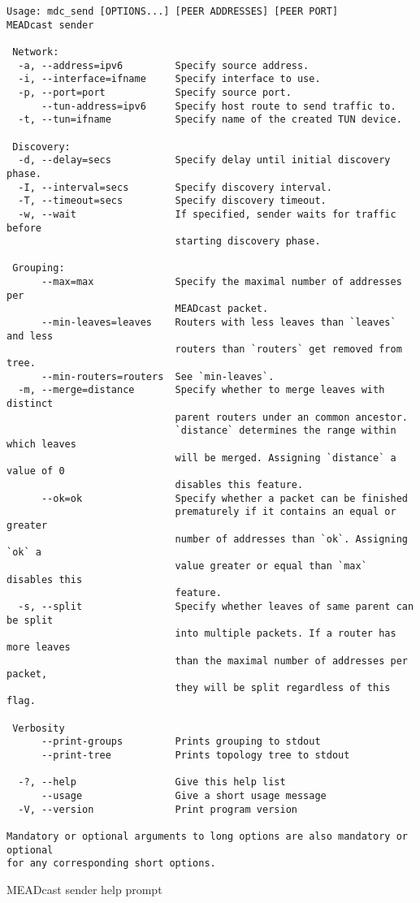 \begin{listing}[h]
\begin{verbatim}
Usage: mdc_send [OPTIONS...] [PEER ADDRESSES] [PEER PORT]
MEADcast sender

 Network:
  -a, --address=ipv6         Specify source address.
  -i, --interface=ifname     Specify interface to use.
  -p, --port=port            Specify source port.
      --tun-address=ipv6     Specify host route to send traffic to.
  -t, --tun=ifname           Specify name of the created TUN device.

 Discovery:
  -d, --delay=secs           Specify delay until initial discovery phase.
  -I, --interval=secs        Specify discovery interval.
  -T, --timeout=secs         Specify discovery timeout.
  -w, --wait                 If specified, sender waits for traffic before
                             starting discovery phase.

 Grouping:
      --max=max              Specify the maximal number of addresses per
                             MEADcast packet.
      --min-leaves=leaves    Routers with less leaves than `leaves` and less
                             routers than `routers` get removed from tree.
      --min-routers=routers  See `min-leaves`.
  -m, --merge=distance       Specify whether to merge leaves with distinct
                             parent routers under an common ancestor.
                             `distance` determines the range within which leaves
                             will be merged. Assigning `distance` a value of 0
                             disables this feature.
      --ok=ok                Specify whether a packet can be finished
                             prematurely if it contains an equal or greater
                             number of addresses than `ok`. Assigning `ok` a
                             value greater or equal than `max` disables this
                             feature.
  -s, --split                Specify whether leaves of same parent can be split
                             into multiple packets. If a router has more leaves
                             than the maximal number of addresses per packet,
                             they will be split regardless of this flag.

 Verbosity
      --print-groups         Prints grouping to stdout
      --print-tree           Prints topology tree to stdout

  -?, --help                 Give this help list
      --usage                Give a short usage message
  -V, --version              Print program version

Mandatory or optional arguments to long options are also mandatory or optional
for any corresponding short options.
\end{verbatim}
\caption{MEADcast sender help prompt}
\label{lst:send_help}
\end{listing}


